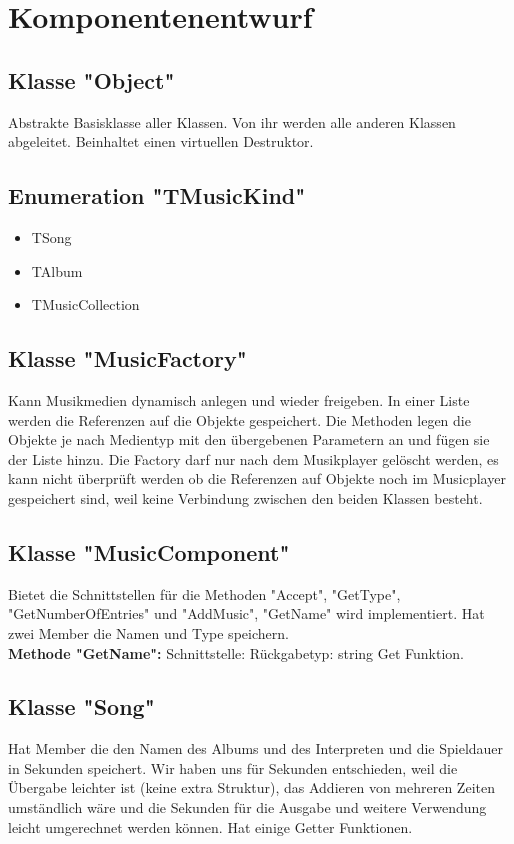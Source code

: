 \documentclass[12pt,a4paper]{article}
\begin{document}
\newpage
\section {Komponentenentwurf}
\subsection {Klasse "Object"}
Abstrakte Basisklasse aller Klassen. Von ihr werden alle anderen Klassen abgeleitet. Beinhaltet einen virtuellen Destruktor.

\subsection {Enumeration "TMusicKind"}
\begin {itemize}
	\item TSong
	\item TAlbum
	\item TMusicCollection	
\end {itemize}


\subsection {Klasse "MusicFactory"}
Kann Musikmedien dynamisch anlegen und wieder freigeben. In einer Liste werden die Referenzen auf die Objekte gespeichert. Die Methoden legen die Objekte je nach Medientyp mit den übergebenen Parametern an und fügen sie der Liste hinzu. Die Factory darf nur nach dem Musikplayer gelöscht werden, es kann nicht überprüft werden ob die Referenzen auf Objekte noch im Musicplayer gespeichert sind, weil keine Verbindung zwischen den beiden Klassen besteht.
\\

\subsection {Klasse "MusicComponent"}
Bietet die Schnittstellen für die Methoden "Accept", "GetType", "GetNumberOfEntries" und "AddMusic", "GetName" wird implementiert. Hat zwei Member die Namen und Type speichern.
\\

\textbf {Methode "GetName": } 
\newline
Schnittstelle:
\newline
Rückgabetyp: string
\newline
Get Funktion.
\\

\subsection {Klasse "Song"}
Hat Member die den Namen des Albums und des Interpreten und die Spieldauer in Sekunden speichert. Wir haben uns für Sekunden entschieden, weil die Übergabe leichter ist (keine extra Struktur), das Addieren von mehreren Zeiten umständlich wäre und die Sekunden für die Ausgabe und weitere Verwendung leicht umgerechnet werden können. Hat einige Getter Funktionen.
\\
\end{document}
